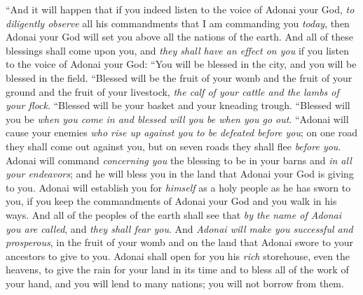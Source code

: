 \begin{biblechapter} %
\verse “And it will happen that if you indeed listen to the voice of Adonai your God, \textit{to diligently observe} all his commandments that I am commanding you \textit{today}, then Adonai your God will set you above all the nations of the earth.
\verse And all of these blessings shall come upon you, and \textit{they shall have an effect on you} if you listen to the voice of Adonai your God:
\verse “You will be blessed in the city, and you will be blessed in the field.
\verse “Blessed will be the fruit of your womb and the fruit of your ground and the fruit of your livestock, \textit{the calf of your cattle and the lambs of your flock}.
\verse “Blessed will be your basket and your kneading trough.
\verse “Blessed will you be \textit{when you come in and blessed will you be when you go out}.
\verse “Adonai will cause your enemies \textit{who rise up against you to be defeated before you}; on one road they shall come out against you, but on seven roads they shall flee \textit{before you}.
\verse Adonai will command \textit{concerning you} the blessing to be in your barns and \textit{in all your endeavors}; and he will bless you in the land that Adonai your God is giving to you.
\verse Adonai will establish you for \textit{himself} as a holy people as he has sworn to you, if you keep the commandments of Adonai your God and you walk in his ways.
\verse And all of the peoples of the earth shall see that \textit{by the name of Adonai you are called}, and \textit{they shall fear you}.
\verse And \textit{Adonai will make you successful and prosperous}, in the fruit of your womb and on the land that Adonai swore to your ancestors to give to you.
\verse Adonai shall open for you his \textit{rich} storehouse, even the heavens, to give the rain for your land in its time and to bless all of the work of your hand, and you will lend to many nations; you will not borrow from them.

\end{biblechapter}
